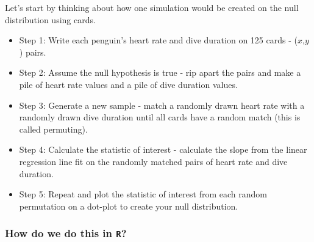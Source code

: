 \documentclass[
  letterpaper,
  DIV=11,
  numbers=noendperiod]{scrartcl}
\providecommand{\tightlist}{%
  \setlength{\itemsep}{0pt}\setlength{\parskip}{0pt}}\usepackage{longtable,booktabs,array}
\begin{document}
Let's start by thinking about how one simulation would be created on the
null distribution using cards.

\begin{itemize}
\tightlist
\item
  Step 1: Write each penguin's heart rate and dive duration on 125 cards
  - (\(x\),\(y\)) pairs.
\end{itemize}

\vspace{0.5}

\begin{itemize}
\tightlist
\item
  Step 2: Assume the null hypothesis is true - rip apart the pairs and
  make a pile of heart rate values and a pile of dive duration values.
\end{itemize}

\vspace{0.5cm}

\begin{itemize}
\tightlist
\item
  Step 3: Generate a new sample - match a randomly drawn heart rate with
  a randomly drawn dive duration until all cards have a random match
  (this is called permuting).
\end{itemize}

\vspace{0.5cm}

\begin{itemize}
\tightlist
\item
  Step 4: Calculate the statistic of interest - calculate the slope from
  the linear regression line fit on the randomly matched pairs of heart
  rate and dive duration.
\end{itemize}

\vspace{0.5cm}

\begin{itemize}
\tightlist
\item
  Step 5: Repeat and plot the statistic of interest from each random
  permutation on a dot-plot to create your null distribution.
\end{itemize}

\vspace{0.5cm}

\hypertarget{how-do-we-do-this-in-r}{%
\subsubsection{\texorpdfstring{How do we do this in
\texttt{R}?}{How do we do this in R?}}\label{how-do-we-do-this-in-r}}
\end{document}
